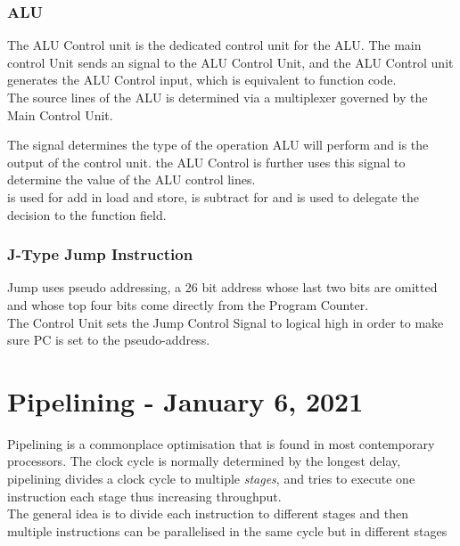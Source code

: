 \documentclass[11pt,a4paper,twocolumn]{book}
\begin{document}
\subsection{ALU}

The ALU Control unit is the dedicated control unit for the ALU. The main control Unit sends an  signal to the ALU Control Unit, and the ALU Control unit generates the ALU Control input, which is equivalent to function code.\\

The source lines of the ALU is determined via a multiplexer governed by the Main Control Unit.

The  signal determines the type of the operation ALU will perform and is the output of the control unit. the ALU Control is further uses this signal to determine the value of the ALU control lines.\\

 is used for add in load and store,  is subtract for  and  is used to delegate the decision to the function field.\\

\subsection{J-Type Jump Instruction}

Jump uses pseudo addressing, a 26 bit address whose last two bits are omitted and whose top four bits come directly from the Program Counter.\\

The Control Unit sets the Jump Control Signal to logical high in order to make sure PC is set to the pseudo-address.

\chapter{Pipelining - January 6, 2021}

Pipelining is a commonplace optimisation that is found in most contemporary processors. The clock cycle is normally determined by the longest delay, pipelining divides a clock cycle to multiple \textit{stages}, and tries to execute one instruction each stage thus increasing throughput.\\

The general idea is to divide each instruction to different stages and then multiple instructions can be parallelised in the same cycle but in different stages\\
\end{document}
